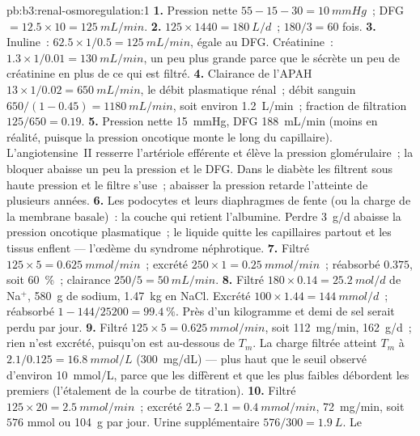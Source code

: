 \begin{solution}{pb:b3:renal-osmoregulation:1}
\textbf{1.} Pression nette $55 - 15 - 30 = \qty{10}{mmHg}$~; DFG $= 12.5
\times 10 = \qty{125}{mL/min}$.
\textbf{2.} $125\times 1440 = \qty{180}{L/d}$~; $180/3 = 60$ fois.
\textbf{3.} Inuline~: $62.5\times 1/0.5 = \qty{125}{mL/min}$, égale au
DFG. Créatinine~: $1.3\times 1/0.01 = \qty{130}{mL/min}$, un peu plus
grande parce que le  sécrète un peu de créatinine en plus
de ce qui est filtré.
\textbf{4.} Clairance de l'APAH $13\times 1/0.02 = \qty{650}{mL/min}$, le
débit plasmatique rénal~; débit sanguin $650/(1 - 0.45) = \qty{1180}{mL/min}$,
soit environ \qty{1.2}{L/min}~; fraction de filtration $125/650 = 0.19$.
\textbf{5.} Pression nette \qty{15}{mmHg}, DFG \qty{188}{mL/min} (moins
en réalité, puisque la pression oncotique monte le long du capillaire).
L'angiotensine~II resserre l'artériole efférente et élève la pression
glomérulaire~; la bloquer abaisse un peu la pression et le DFG. Dans le
diabète les  filtrent sous haute pression et le filtre s'use~;
abaisser la pression retarde l'atteinte de plusieurs années.
\textbf{6.} Les podocytes et leurs diaphragmes de fente (ou la charge de
la membrane basale)~: la couche qui retient l'albumine. Perdre
\qty{3}{g/d} abaisse la pression oncotique plasmatique~; le liquide
quitte les capillaires partout et les tissus enflent --- l'œdème du
syndrome néphrotique.
\textbf{7.} Filtré $125\times 5 = \qty{0.625}{mmol/min}$~; excrété
$250\times 1 = \qty{0.25}{mmol/min}$~; réabsorbé $0.375$, soit
\qty{60}{\%}~; clairance $250/5 = \qty{50}{mL/min}$.
\textbf{8.} Filtré $180\times 0.14 = \qty{25.2}{mol/d}$ de Na$^{+}$,
\qty{580}{g} de sodium, \qty{1.47}{kg} en NaCl. Excrété $100\times 1.44
= \qty{144}{mmol/d}$~; réabsorbé $1 - 144/\num{25200} = \qty{99.4}{\%}$.
Près d'un kilogramme et demi de sel serait perdu par jour.
\textbf{9.} Filtré $125\times 5 = \qty{0.625}{mmol/min}$, soit
\qty{112}{mg/min}, \qty{162}{g/d}~; rien n'est excrété, puisqu'on est
au-dessous de $T_{m}$. La charge filtrée atteint $T_{m}$ à $2.1/0.125 =
\qty{16.8}{mmol/L}$ (\qty{300}{mg/dL}) --- plus haut que le seuil observé
d'environ \qty{10}{mmol/L}, parce que les  diffèrent et que les
plus faibles débordent les premiers (l'étalement de la courbe de
titration).
\textbf{10.} Filtré $125\times 20 = \qty{2.5}{mmol/min}$~; excrété
$2.5 - 2.1 = \qty{0.4}{mmol/min}$, \qty{72}{mg/min}, soit $576$ mmol ou
\qty{104}{g} par jour. Urine supplémentaire $576/300 = \qty{1.9}{L}$. Le

\end{solution}
